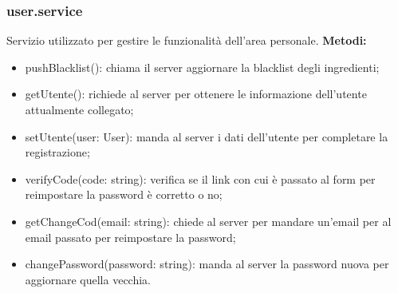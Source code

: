 \subsubsection{user.service}
Servizio utilizzato per gestire le funzionalità dell'area personale.
\textbf{Metodi:}
\begin{itemize}
    \item pushBlacklist(): chiama il server aggiornare la blacklist degli ingredienti;
    \item getUtente(): richiede al server per ottenere le informazione dell'utente attualmente collegato;
    \item setUtente(user: User): manda al server i dati dell'utente per completare la registrazione;
    \item verifyCode(code: string): verifica se il link con cui è passato al form per reimpostare la password è corretto o no;
    \item getChangeCod(email: string): chiede al server per mandare un'email per al email passato per reimpostare la password;
    \item changePassword(password: string): manda al server la password nuova per aggiornare quella vecchia.
\end{itemize}